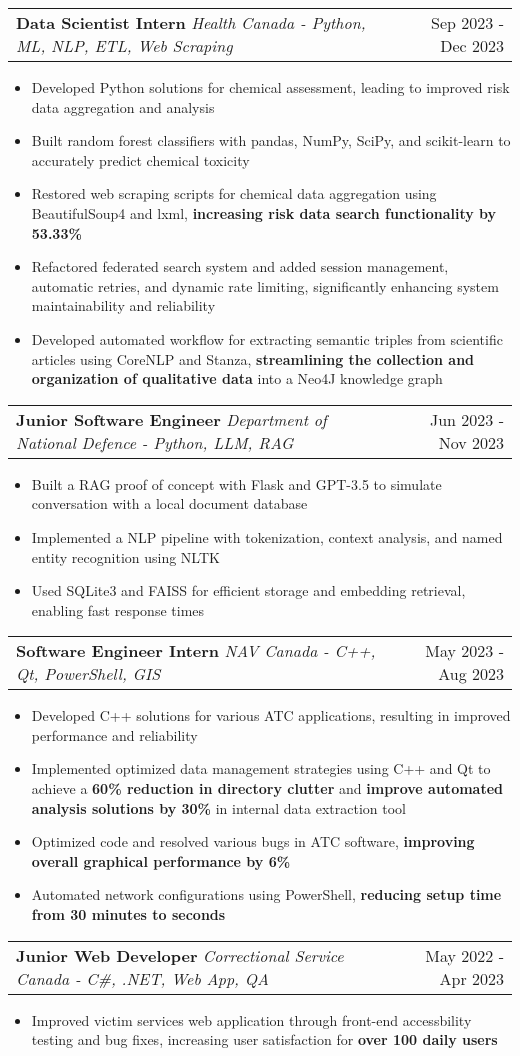 \documentclass[letterpaper,11pt]{article}
\makeatletter
\newcommand{\resumeItem}[1]{
  \item\small{
    {#1 \vspace{-3pt}}
  }
}
\newcommand{\resumeSubheading}[3]{
    \item
    \begin{tabular*}{0.97\textwidth}[t]{l@{\extracolsep{\fill}}r}
      \textbf{#1} \textbar \textit{ #2} & #3 \\
    \end{tabular*}\vspace{-7.5pt}
}
\newcommand{\resumeItemListStart}{\begin{itemize}}
\newcommand{\resumeItemListEnd}{\end{itemize}\vspace{-5pt}}
\makeatother
\begin{document}
    \resumeSubheading
      {Data Scientist Intern}{Health Canada - Python, ML, NLP, ETL, Web Scraping}{Sep 2023 - Dec 2023}
      \resumeItemListStart
        \resumeItem{Developed Python solutions for chemical assessment, leading to improved risk data aggregation and analysis}
        \resumeItem{Built random forest classifiers with pandas, NumPy, SciPy, and scikit-learn to accurately predict chemical toxicity}
        \resumeItem{Restored web scraping scripts for chemical data aggregation using BeautifulSoup4 and lxml, \textbf{increasing risk data search functionality by 53.33\%}}
        \resumeItem{Refactored federated search system and added session management, automatic retries, and dynamic rate limiting, significantly enhancing system maintainability and reliability}
        \resumeItem{Developed automated workflow for extracting semantic triples from scientific articles using CoreNLP and Stanza, \textbf{streamlining the collection and organization of qualitative data} into a Neo4J knowledge graph}
      \resumeItemListEnd

    \resumeSubheading
    {Junior Software Engineer}{Department of National Defence - Python, LLM, RAG}{Jun 2023 - Nov 2023}
      \resumeItemListStart
        \resumeItem{Built a RAG proof of concept with Flask and GPT-3.5 to simulate conversation with a local document database}
        \resumeItem{Implemented a NLP pipeline with tokenization, context analysis, and named entity recognition using NLTK}
        \resumeItem{Used SQLite3 and FAISS for efficient storage and embedding retrieval, enabling fast response times}
      \resumeItemListEnd

    \resumeSubheading
    {Software Engineer Intern}{NAV Canada - C++, Qt, PowerShell, GIS}{May 2023 - Aug 2023}
      \resumeItemListStart
        \resumeItem{Developed C++ solutions for various ATC applications, resulting in improved performance and reliability}
        \resumeItem{Implemented optimized data management strategies using C++ and Qt to achieve a \textbf{60\% reduction in directory clutter} and \textbf{improve automated analysis solutions by 30\%} in internal data extraction tool}
        \resumeItem{Optimized code and resolved various bugs in ATC software, \textbf{improving overall graphical performance by 6\%}}
        \resumeItem{Automated network configurations using PowerShell, \textbf{reducing setup time from 30 minutes to seconds}}
      \resumeItemListEnd

    \resumeSubheading
    {Junior Web Developer}{Correctional Service Canada - C\#, .NET, Web App, QA}{May 2022 - Apr 2023}
      \resumeItemListStart
        \resumeItem{Improved victim services web application through front-end accessbility testing and bug fixes, increasing user satisfaction for \textbf{over 100 daily users}}
      \resumeItemListEnd
\end{document}
